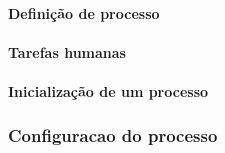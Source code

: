 \paragraph{Definição de processo}











\paragraph{Tarefas humanas}\label{sec:integracao_redmine_activiti_implementacao_detalhes_desenvolvimento_sincronizaca_human_task}

\paragraph{Inicialização de um processo}\label{sec:integracao_redmine_activiti_implementacao_detalhes_desenvolvimento_sincronizacao_processo}


\subsubsection{Configuracao do processo}\label{sec:integracao_redmine_activiti_implementacao_detalhes_desenvolvimento_configuracao}

